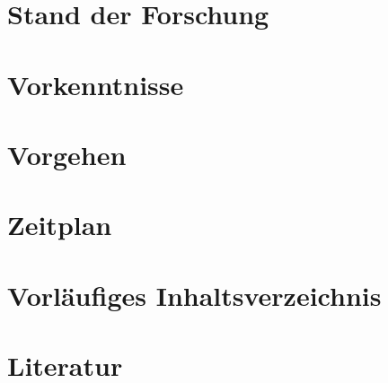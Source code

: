 \documentclass[a4paper,pointlessnumbers]{article}
\begin{document}
  \section{Stand der Forschung}
      
  \section{Vorkenntnisse}
      
  \section{Vorgehen}
      
  \section{Zeitplan}
      
  \section{Vorläufiges Inhaltsverzeichnis}
      
  \section{Literatur}
      
\end{document}
